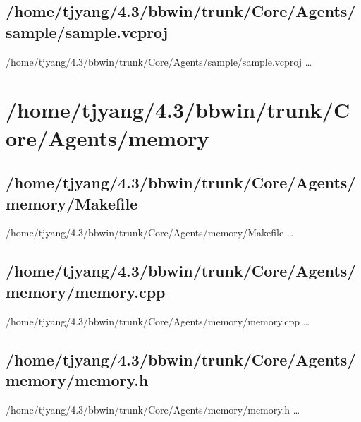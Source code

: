 \subsection{/home/tjyang/4.3/bbwin/trunk/Core/Agents/sample/sample.vcproj}
\lstset{numberstyle=\tiny,numbers=left,
   breaklines=true,
   stepnumber=1,numbersep=5pt,firstnumber=1,
   xleftmargin=12pt,showstringspaces=false}
\noindent /home/tjyang/4.3/bbwin/trunk/Core/Agents/sample/sample.vcproj  \ldots



\section{/home/tjyang/4.3/bbwin/trunk/Core/Agents/memory}

\subsection{/home/tjyang/4.3/bbwin/trunk/Core/Agents/memory/Makefile}
\lstset{numberstyle=\tiny,numbers=left,
   breaklines=true,
   stepnumber=1,numbersep=5pt,firstnumber=1,
   xleftmargin=12pt,showstringspaces=false}
\noindent /home/tjyang/4.3/bbwin/trunk/Core/Agents/memory/Makefile  \ldots



\subsection{/home/tjyang/4.3/bbwin/trunk/Core/Agents/memory/memory.cpp}
\lstset{numberstyle=\tiny,numbers=left,
   breaklines=true,
   stepnumber=1,numbersep=5pt,firstnumber=1,
   xleftmargin=12pt,showstringspaces=false}
\noindent /home/tjyang/4.3/bbwin/trunk/Core/Agents/memory/memory.cpp  \ldots



\subsection{/home/tjyang/4.3/bbwin/trunk/Core/Agents/memory/memory.h}
\lstset{numberstyle=\tiny,numbers=left,
   breaklines=true,
   stepnumber=1,numbersep=5pt,firstnumber=1,
   xleftmargin=12pt,showstringspaces=false}
\noindent /home/tjyang/4.3/bbwin/trunk/Core/Agents/memory/memory.h  \ldots



